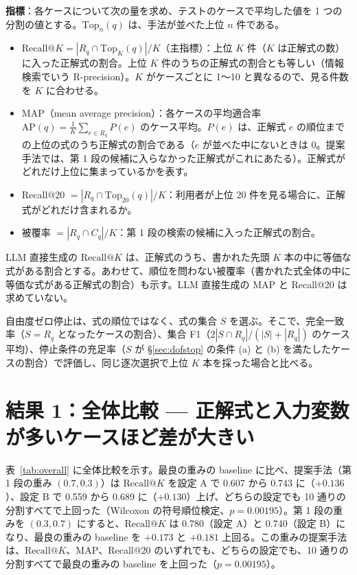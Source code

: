 \documentclass[a4j,dvipdfmx,11pt]{jresume}
\makeatletter
\newcommand{\rk}{\textrm{Recall@}K}
\makeatother
\begin{document}
\textbf{指標}：各ケースについて次の量を求め、テストのケースで平均した値を 1 つの分割の値とする。$\mathrm{Top}_n(q)$ は、手法が並べた上位 $n$ 件である。
\begin{itemize}[leftmargin=1.5em]
  \item $\rk = |R_q \cap \mathrm{Top}_K(q)| / K$（主指標）：上位 $K$ 件（$K$ は正解式の数）に入った正解式の割合。上位 $K$ 件のうちの正解式の割合とも等しい（情報検索でいう R-precision）。$K$ がケースごとに 1〜10 と異なるので、見る件数を $K$ に合わせる。
  \item MAP（mean average precision）：各ケースの平均適合率 $\mathrm{AP}(q) = \frac{1}{K} \sum_{e \in R_q} P(e)$ のケース平均。$P(e)$ は、正解式 $e$ の順位までの上位の式のうち正解式の割合である（$e$ が並べた中にないときは 0。提案手法では、第 1 段の候補に入らなかった正解式がこれにあたる）。正解式がどれだけ上位に集まっているかを表す。
  \item Recall@20 $= |R_q \cap \mathrm{Top}_{20}(q)| / K$：利用者が上位 20 件を見る場合に、正解式がどれだけ含まれるか。
  \item 被覆率 $= |R_q \cap C_q| / K$：第 1 段の検索の候補に入った正解式の割合。
\end{itemize}
LLM 直接生成の $\rk$ は、正解式のうち、書かれた先頭 $K$ 本の中に等価な式がある割合とする。あわせて、順位を問わない被覆率（書かれた式全体の中に等価な式がある正解式の割合）も示す。LLM 直接生成の MAP と Recall@20 は求めていない。

自由度ゼロ停止は、式の順位ではなく、式の集合 $S$ を選ぶ。そこで、完全一致率（$S = R_q$ となったケースの割合）、集合 F1（$2|S \cap R_q| / (|S| + |R_q|)$ のケース平均）、停止条件の充足率（$S$ が \S\ref{sec:dofstop} の条件 (a) と (b) を満たしたケースの割合）で評価し、同じ逐次選択で上位 $K$ 本を採った場合と比べる。

\section{結果 1：全体比較 --- 正解式と入力変数が多いケースほど差が大きい}\label{sec:overall}
表~\ref{tab:overall} に全体比較を示す。最良の重みの baseline に比べ、提案手法（第 1 段の重み $(0.7, 0.3)$）は $\rk$ を設定 A で 0.607 から 0.743 に（$+0.136$）、設定 B で 0.559 から 0.689 に（$+0.130$）上げ、どちらの設定でも 10 通りの分割すべてで上回った（Wilcoxon の符号順位検定、$p = 0.00195$）。第 1 段の重みを $(0.3, 0.7)$ にすると、$\rk$ は 0.780（設定 A）と 0.740（設定 B）になり、最良の重みの baseline を $+0.173$ と $+0.181$ 上回る。この重みの提案手法は、$\rk$、MAP、Recall@20 のいずれでも、どちらの設定でも、10 通りの分割すべてで最良の重みの baseline を上回った（$p = 0.00195$）。
\end{document}
